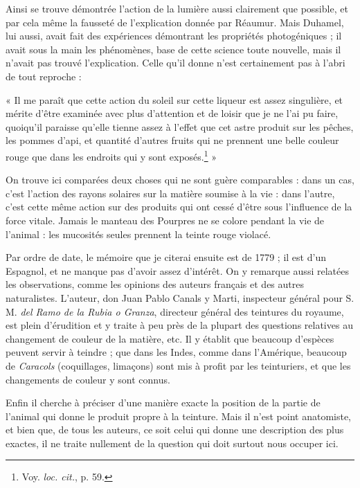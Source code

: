 \documentclass[a4paper, 11pt, oneside, polutonikogreek, french]{article}
\begin{document}
Ainsi se trouve démontrée l'action de la lumière aussi clairement que possible, et par cela même la fausseté de l'explication donnée par Réaumur. Mais Duhamel, lui aussi, avait fait des expériences démontrant les propriétés photogéniques ; il avait sous la main les phénomènes, base de cette science toute nouvelle, mais il n'avait pas trouvé l'explication. Celle qu'il donne n'est certainement pas à l'abri de tout reproche :

« Il me paraît que cette action du soleil sur cette liqueur est assez singulière, et mérite d'être examinée avec plus d'attention et de loisir que je ne l'ai pu faire, quoiqu'il paraisse qu'elle tienne assez à l'effet que cet astre produit sur les pêches, les pommes d'api, et quantité d'autres fruits qui ne prennent une belle couleur rouge que dans les endroits qui y sont exposés.\footnote{Voy. \emph{loc. cit.}, p. 59.} »

On trouve ici comparées deux choses qui ne sont guère comparables : dans un cas, c'est l'action des rayons solaires sur la matière soumise à la vie : dans l'autre, c'est cette même action sur des produits qui ont cessé d'être sous l'influence de la force vitale. Jamais le manteau des Pourpres ne se colore pendant la vie de l'animal : les mucosités seules prennent la teinte rouge violacé.

Par ordre de date, le mémoire que je citerai ensuite est de 1779 ; il est d'un Espagnol, et ne manque pas d'avoir assez d'intérêt. On y remarque aussi relatées les observations, comme les opinions des auteurs français et des autres naturalistes. L'auteur, don Juan Pablo Canals y Marti, inspecteur général pour S. M. \emph{del Ramo de la Rubia o Granza}, directeur général des teintures du royaume, est plein d'érudition et y traite à peu près de la plupart des questions relatives au changement de couleur de la matière, etc. Il y établit que beaucoup d'espèces peuvent servir à teindre ; que dans les Indes, comme dans l'Amérique, beaucoup de \emph{Caracols} (coquillages, limaçons) sont mis à profit par les teinturiers, et que les changements de couleur y sont connus.

Enfin il cherche à préciser d'une manière exacte la position de la partie de l'animal qui donne le produit propre à la teinture. Mais il n'est point anatomiste, et bien que, de tous les auteurs, ce soit celui qui donne une description des plus exactes, il ne traite nullement de la question qui doit surtout nous occuper ici.
\end{document}
